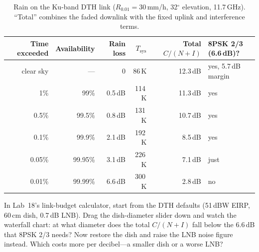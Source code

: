 
\begin{table}[htbp]\centering\small
\caption{Rain on the Ku-band DTH link ($R_{0.01}=30$\,mm/h, 32$^\circ$ elevation, 11.7\,GHz).
``Total'' combines the faded downlink with the fixed uplink and interference terms.}\label{tab:ch23:dthrain}
\begin{tabular}{@{}r r r r r l@{}}
\toprule
Time exceeded & Availability & Rain loss & $T_{\text{sys}}$ & Total $C/(N+I)$ & 8PSK 2/3 (6.6\,dB)?\\
\midrule
clear sky & --- & 0 & 86\,K & 12.3\,dB & yes, 5.7\,dB margin\\
1\% & 99\% & 0.5\,dB & 114\,K & 11.3\,dB & yes\\
0.5\% & 99.5\% & 0.8\,dB & 131\,K & 10.7\,dB & yes\\
0.1\% & 99.9\% & 2.1\,dB & 192\,K & 8.5\,dB & yes\\
0.05\% & 99.95\% & 3.1\,dB & 226\,K & 7.1\,dB & just\\
0.01\% & 99.99\% & 6.6\,dB & 300\,K & 2.8\,dB & no\\
\bottomrule
\end{tabular}
\end{table}

\begin{tryit}
In Lab~18's link-budget calculator, start from the DTH defaults (51\,dBW EIRP, 60\,cm dish,
0.7\,dB LNB). Drag the dish-diameter slider down and watch the waterfall chart: at what diameter
does the total $C/(N+I)$ fall below the 6.6\,dB that 8PSK 2/3 needs? Now restore the dish and
raise the LNB noise figure instead. Which costs more per decibel---a smaller dish or a worse LNB?
\end{tryit}


